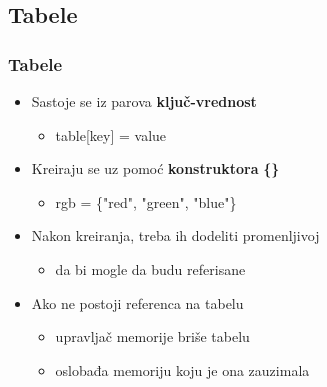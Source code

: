 \documentclass{beamer}
\begin{document}
\subsection{Tabele}
\begin{frame}
\frametitle{Tabele}
\begin{itemize}
\item Sastoje se iz parova \textbf{ključ-vrednost}
\begin{itemize}
\item \begin{semiverbatim} table[key] = value \end{semiverbatim}
\end{itemize}
\item Kreiraju se uz pomoć \textbf{konstruktora} \textbf{\{\}}
\begin{itemize}
\item \begin{semiverbatim} rgb = \{"red", "green", "blue"\} \end{semiverbatim}
\end{itemize}
\item Nakon kreiranja, treba ih dodeliti promenljivoj
\begin{itemize}
\item da bi mogle da budu referisane
\end{itemize}
\item Ako ne postoji referenca na tabelu
\begin{itemize}
\item upravljač memorije briše tabelu
\item oslobađa memoriju koju je ona zauzimala
\end{itemize}
\end{itemize}
\end{frame}

\end{document}

